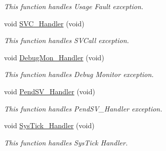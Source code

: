 \begin{DoxyCompactItemize}
\begin{DoxyCompactList}\small\item\em This function handles Usage Fault exception. \end{DoxyCompactList}\item 
void \hyperlink{group___f_l_a_s_h___program_ga3e5ddb3df0d62f2dc357e64a3f04a6ce}{S\-V\-C\-\_\-\-Handler} (void)
\begin{DoxyCompactList}\small\item\em This function handles S\-V\-Call exception. \end{DoxyCompactList}\item 
void \hyperlink{group___f_l_a_s_h___program_gadbdfb05858cc36fc520974df37ec3cb0}{Debug\-Mon\-\_\-\-Handler} (void)
\begin{DoxyCompactList}\small\item\em This function handles Debug Monitor exception. \end{DoxyCompactList}\item 
void \hyperlink{group___f_l_a_s_h___program_ga6303e1f258cbdc1f970ce579cc015623}{Pend\-S\-V\-\_\-\-Handler} (void)
\begin{DoxyCompactList}\small\item\em This function handles Pend\-S\-V\-\_\-\-Handler exception. \end{DoxyCompactList}\item 
void \hyperlink{group___f_l_a_s_h___program_gab5e09814056d617c521549e542639b7e}{Sys\-Tick\-\_\-\-Handler} (void)
\begin{DoxyCompactList}\small\item\em This function handles Sys\-Tick Handler. \end{DoxyCompactList}\end{DoxyCompactItemize}
